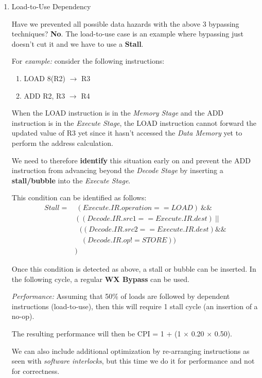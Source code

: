 \documentclass[12pt]{article}
\newenvironment{QandA}{\begin{enumerate}[label=\bfseries\arabic*.]\bfseries}
                      {\end{enumerate}}
\newenvironment{answered}{\par\quad\normalfont}{}
\begin{document}
\begin{QandA}
    \item Load-to-Use Dependency
    \begin{answered}
    Have we prevented all possible data hazards with the above 3 bypassing techniques? \textbf{No}. The load-to-use case is an example where bypassing just doesn't cut it and we have to use a \textbf{Stall}.
    
    For \textit{example:} consider the following instructions:
    \begin{enumerate}
        \item LOAD 8(R2) $\rightarrow$ R3
        \item ADD R2, R3 $\rightarrow$ R4
    \end{enumerate}
    When the LOAD instruction is in the \textit{Memory Stage} and the ADD instruction is in the \textit{Execute Stage}, the LOAD instruction cannot forward the updated value of R3 yet since it hasn't accessed the \textit{Data Memory} yet to perform the address calculation. 
    
    We need to therefore \textbf{identify} this situation early on and prevent the ADD instruction from advancing beyond the \textit{Decode Stage} by inserting a \textbf{stall/bubble} into the \textit{Execute Stage}.
    
    This condition can be identified as follows:
    \begin{equation*}
    \begin{split}
    Stall = &\ (Execute.IR.operation == LOAD)\ \&\& \\ &\ (\ (Decode.IR.src1 == Execute.IR.dest)\ || \\ &\ \ \ ((Decode.IR.src2 == Execute.IR.dest) \&\& \\ &\ \ \ \ (Decode.IR.op != STORE)) \\ &)
    \end{split}
    \end{equation*}     
    
    Once this condition is detected as above, a stall or bubble can be inserted. In the following cycle, a regular \textbf{WX Bypass} can be used.
    
    \textit{Performance:} Assuming that 50\% of loads are followed by dependent instructions (load-to-use), then this will require 1 stall cycle (an insertion of a no-op).
    
    The resulting performance will then be CPI = 1 + (1 $\times$ 0.20 $\times$ 0.50).
    
    We can also include additional optimization by re-arranging instructions as seen with \textit{software interlocks}, but this time we do it for performance and not for correctness. 
    \end{answered}


\end{QandA}
\end{document}
